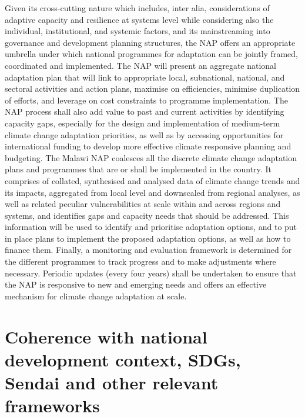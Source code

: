 \documentclass[
]{book}
\begin{document}
Given its cross-cutting nature which includes, inter alia, considerations of adaptive capacity and resilience at systems level while considering also the individual, institutional, and systemic factors, and its mainstreaming into governance and development planning structures, the NAP offers an appropriate umbrella under which national programmes for adaptation can be jointly framed, coordinated and implemented. The NAP will present an aggregate national adaptation plan that will link to appropriate local, subnational, national, and sectoral activities and action plans, maximise on efficiencies, minimise duplication of efforts, and leverage on cost constraints to programme implementation. The NAP process shall also add value to past and current activities by identifying capacity gaps, especially for the design and implementation of medium-term climate change adaptation priorities, as well as by accessing opportunities for international funding to develop more effective climate responsive planning and budgeting. The Malawi NAP coalesces all the discrete climate change adaptation plans and programmes that are or shall be implemented in the country. It comprises of collated, synthesised and analysed data of climate change trends and its impacts, aggregated from local level and downscaled from regional analyses, as well as related peculiar vulnerabilities at scale within and across regions and systems, and identifies gaps and capacity needs that should be addressed. This information will be used to identify and prioritise adaptation options, and to put in place plans to implement the proposed adaptation options, as well as how to finance them. Finally, a monitoring and evaluation framework is determined for the different programmes to track progress and to make adjustments where necessary. Periodic updates (every four years) shall be undertaken to ensure that the NAP is responsive to new and emerging needs and offers an effective mechanism for climate change adaptation at scale.

\hypertarget{coherence-with-national-development-context-sdgs-sendai-and-other-relevant-frameworks}{%
\section{Coherence with national development context, SDGs, Sendai and other relevant frameworks}\label{coherence-with-national-development-context-sdgs-sendai-and-other-relevant-frameworks}}
\end{document}
